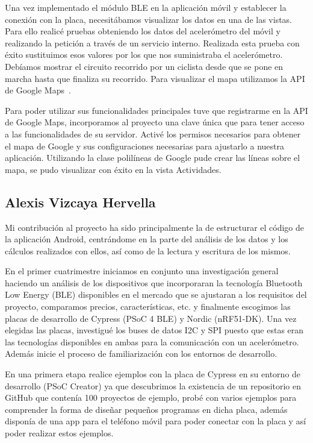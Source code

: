 Una vez implementado el módulo BLE en la aplicación móvil y establecer la conexión con la placa, necesitábamos visualizar los datos en una de las vistas.
Para ello realicé pruebas obteniendo los datos del acelerómetro del móvil y realizando la petición a través de un servicio interno. Realizada esta prueba con éxito sustituimos esos valores por los que nos suministraba el acelerómetro.
Debíamos mostrar el circuito recorrido por un ciclista desde que se pone en marcha hasta que finaliza su recorrido. Para visualizar el mapa utilizamos la API de Google Maps~\cite{APIGoogleMaps}.

Para poder utilizar sus funcionalidades principales tuve que registrarme en la API de Google Maps, incorporamos al proyecto una clave única que para tener acceso a las funcionalidades de su servidor. Activé los permisos necesarios para obtener el mapa de Google y sus configuraciones necesarias para ajustarlo a nuestra aplicación. Utilizando la clase polilíneas de Google pude crear las líneas sobre el mapa, se pudo visualizar con éxito en la vista Actividades.


\subsection{Alexis Vizcaya Hervella}

Mi contribución al proyecto ha sido principalmente la de estructurar el código de la aplicación Android, centrándome en la parte del análisis de los datos y los cálculos realizados con ellos, así como de la lectura y escritura de los mismos.  

En el primer cuatrimestre iniciamos en conjunto una investigación general haciendo un análisis de los dispositivos que incorporaran la tecnología Bluetooth Low Energy (BLE) disponibles en el mercado que se ajustaran a los requisitos del proyecto, comparamos precios, características, etc. y finalmente escogimos las placas de desarrollo de Cypress (PSoC 4 BLE) y Nordic (nRF51-DK). Una vez elegidas las placas, investigué los buses de datos I2C y SPI puesto que estas eran las tecnologías disponibles en ambas para la comunicación con un acelerómetro. Además inicie el proceso de familiarización con los entornos de desarrollo.

En una primera etapa realice ejemplos con la placa de Cypress en su entorno de desarrollo (PSoC Creator) ya que descubrimos la existencia de un repositorio en GitHub que contenía 100 proyectos de ejemplo, probé con varios ejemplos para comprender la forma de diseñar pequeños programas en dicha placa, además disponía de una app para el teléfono móvil para poder conectar con la placa y así poder realizar estos ejemplos. 

